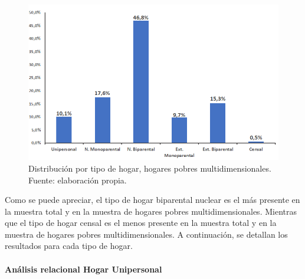 \documentclass[12pt,letterpaper,spanish]{article}
\begin{document}
\begin{figure}[H]
    \centering
    \includegraphics[width=\textwidth]{Max/distribucion_hog_pobres_por_tipo_hogar.png}
    \caption{Distribución por tipo de hogar, hogares pobres multidimensionales. Fuente: elaboración propia.}
    \label{distHogarpobres}
\end{figure}
Como se puede apreciar, el tipo de hogar biparental nuclear es el más presente en la muestra total y en la muestra de hogares pobres multidimensionales. Mientras que el tipo de hogar censal es el menos presente en la muestra total y en la muestra de hogares pobres multidimensionales. A continuación, se detallan los resultados para cada tipo de hogar.


\paragraph{Análisis relacional Hogar Unipersonal}
\end{document}
